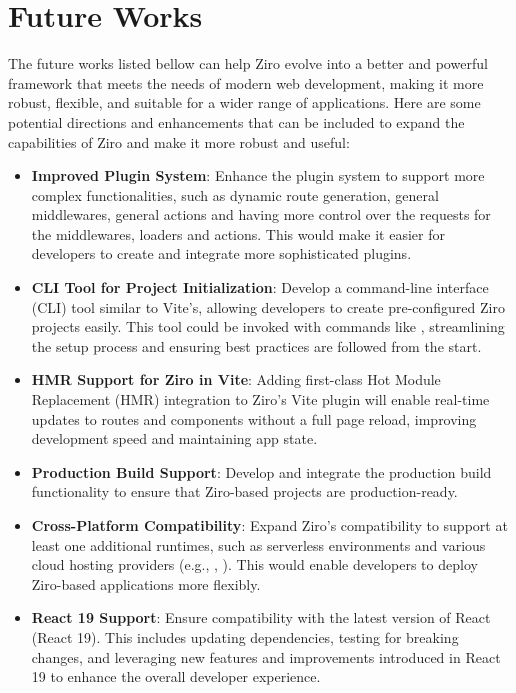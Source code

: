 \section{Future Works} %

The future works listed bellow can help Ziro evolve into a better and powerful framework that meets the needs of modern web development, making it more robust, flexible, and suitable for a wider range of applications. Here are some potential directions and enhancements that can be included to expand the capabilities of Ziro and make it more robust and useful:

\begin{itemize}
	\item  \textbf{Improved Plugin System}: Enhance the plugin system to support more complex functionalities, such as dynamic route generation, general middlewares, general actions and having more control over the requests for the middlewares, loaders and actions. This would make it easier for developers to create and integrate more sophisticated plugins.

	\item \textbf{CLI Tool for Project Initialization}: Develop a command-line interface (CLI) tool similar to Vite's, allowing developers to create pre-configured Ziro projects easily. This tool could be invoked with commands like , streamlining the setup process and ensuring best practices are followed from the start.

	\item \textbf{HMR Support for Ziro in Vite}: Adding first-class Hot Module Replacement (HMR) integration to Ziro's Vite plugin will enable real-time updates to routes and components without a full page reload, improving development speed and maintaining app state.

	\item \textbf{Production Build Support}: Develop and integrate the production build functionality to ensure that Ziro-based projects are production-ready.

	\item  \textbf{Cross-Platform Compatibility}: Expand Ziro's compatibility to support at least one additional runtimes, such as serverless environments and various cloud hosting providers (e.g., , ). This would enable developers to deploy Ziro-based applications more flexibly.

	\item \textbf{React 19 Support}: Ensure compatibility with the latest version of React (React 19). This includes updating dependencies, testing for breaking changes, and leveraging new features and improvements introduced in React 19 to enhance the overall developer experience.


\end{itemize}
